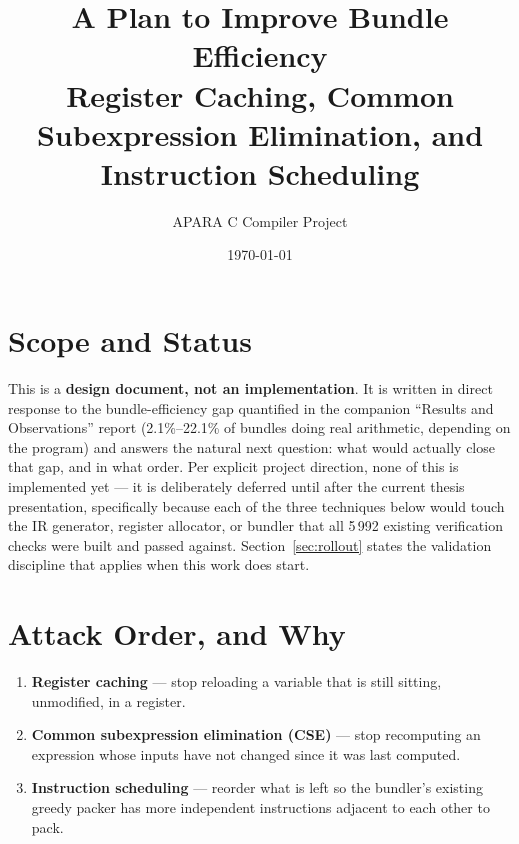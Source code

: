 \documentclass[11pt,a4paper]{article}
\title{\textbf{A Plan to Improve Bundle Efficiency}\\[2mm]
\large Register Caching, Common Subexpression Elimination, and Instruction Scheduling}
\author{APARA C Compiler Project}
\date{\today}
\begin{document}
\maketitle
\thispagestyle{fancy}
\vspace{-8mm}

\section{Scope and Status}

This is a \textbf{design document, not an implementation}. It is written in direct
response to the bundle-efficiency gap quantified in the companion ``Results and
Observations'' report (2.1\%--22.1\% of bundles doing real arithmetic, depending on the
program) and answers the natural next question: what would actually close that gap, and
in what order. Per explicit project direction, none of this is implemented yet --- it is
deliberately deferred until after the current thesis presentation, specifically because
each of the three techniques below would touch the IR generator, register allocator, or
bundler that all 5\,992 existing verification checks were built and passed against.
Section~\ref{sec:rollout} states the validation discipline that applies when this work
does start.

\section{Attack Order, and Why}

\begin{enumerate}
  \item \textbf{Register caching} --- stop reloading a variable that is still sitting,
        unmodified, in a register.
  \item \textbf{Common subexpression elimination (CSE)} --- stop recomputing an
        expression whose inputs have not changed since it was last computed.
  \item \textbf{Instruction scheduling} --- reorder what is left so the bundler's
        existing greedy packer has more independent instructions adjacent to each other
        to pack.
\end{enumerate}
\end{document}
